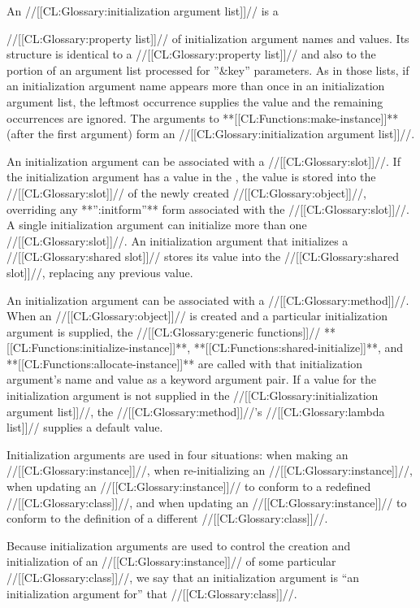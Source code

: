  An //[[CL:Glossary:initialization argument list]]// is a

//[[CL:Glossary:property list]]// of initialization argument names and values. Its structure is identical to a //[[CL:Glossary:property list]]// and also  to the portion of an argument list processed for ''&key'' parameters. As in those lists, if an initialization argument name appears more than once in an initialization argument list, the leftmost occurrence supplies the value and the remaining occurrences are ignored.  The arguments to **[[CL:Functions:make-instance]]** (after the first argument) form an //[[CL:Glossary:initialization argument list]]//. 

An initialization argument can be associated with a //[[CL:Glossary:slot]]//.  If the initialization argument has a value in the , the value is stored into the //[[CL:Glossary:slot]]// of the newly created //[[CL:Glossary:object]]//, overriding any **'':initform''** form associated with the //[[CL:Glossary:slot]]//.  A single initialization argument can initialize more than one //[[CL:Glossary:slot]]//.  An initialization argument that initializes a //[[CL:Glossary:shared slot]]// stores its value into the //[[CL:Glossary:shared slot]]//, replacing any previous value.

An initialization argument can be associated with a //[[CL:Glossary:method]]//.  When an //[[CL:Glossary:object]]// is created and a particular initialization argument is supplied, the //[[CL:Glossary:generic functions]]// **[[CL:Functions:initialize-instance]]**, **[[CL:Functions:shared-initialize]]**, and **[[CL:Functions:allocate-instance]]** are called with that initialization argument's name and value as a keyword argument pair.  If a value for the initialization argument is not supplied in the //[[CL:Glossary:initialization argument list]]//, the //[[CL:Glossary:method]]//'s  //[[CL:Glossary:lambda list]]// supplies a default value.

Initialization arguments are used in four situations: when making an //[[CL:Glossary:instance]]//, when re-initializing an //[[CL:Glossary:instance]]//, when updating an //[[CL:Glossary:instance]]// to conform to a redefined //[[CL:Glossary:class]]//, and when updating an //[[CL:Glossary:instance]]// to conform to the definition of a different //[[CL:Glossary:class]]//.

Because initialization arguments are used to control the creation and initialization of an //[[CL:Glossary:instance]]// of some particular //[[CL:Glossary:class]]//, we say that an initialization argument is ``an initialization argument for'' that //[[CL:Glossary:class]]//.

